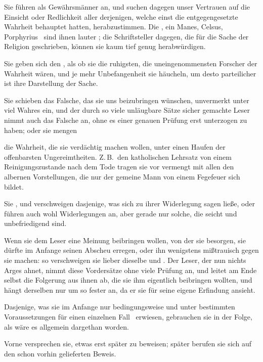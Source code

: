 \begin{aufza}
\begin{aufzb}
\begin{aufzc}
\item Sie führen  als Gewährsmänner an, und suchen dagegen unser Vertrauen auf die Einsicht oder Redlichkeit aller derjenigen, welche einst die entgegengesetzte Wahrheit behauptet hatten, herabzustimmen. Die , ein Manes, Celsus, Porphyrius \uA\ sind ihnen lauter ; die Schriftsteller dagegen, die für die Sache der Religion geschrieben, können sie kaum tief genug herabwürdigen.
\item Sie geben sich den , als ob sie die ruhigsten, die uneingenommensten Forscher der Wahrheit wären, und je mehr Unbefangenheit sie häucheln, um desto parteilicher ist ihre Darstellung der Sache.
\item Sie schieben das Falsche, das sie uns beizubringen wünschen, unvermerkt unter viel Wahres ein, und der durch so viele unläugbare Sätze sicher gemachte Leser nimmt auch das Falsche an, ohne es einer genauen Prüfung erst unterzogen zu haben; oder sie mengen
\item die Wahrheit, die sie verdächtig machen wollen, unter einen Haufen der offenbarsten Ungereimtheiten. Z.\,B.\ den katholischen Lehrsatz von einem Reinigungszustande nach dem Tode tragen sie vor vermengt mit allen den albernen Vorstellungen, die nur der gemeine Mann von einem Fegefeuer sich bildet.
\item Sie , und verschweigen dasjenige, was sich zu ihrer Widerlegung sagen ließe, oder führen auch wohl Widerlegungen an, aber gerade nur solche, die seicht und unbefriedigend sind.
\item Wenn sie dem Leser eine Meinung beibringen wollen, von der sie besorgen, sie dürfte im Anfange seinen Abscheu erregen, oder ihn wenigstens mißtrauisch gegen sie machen: so verschweigen sie lieber dieselbe und . Der Leser, der nun nichts Arges ahnet, nimmt diese Vordersätze ohne viele Prüfung an, und leitet am Ende selbst die Folgerung aus ihnen ab, die sie ihm eigentlich beibringen wollten, und hängt derselben nur um so fester an, da er sie für seine eigene Erfindung ansieht.
\item Dasjenige, was sie im Anfange nur bedingungsweise und unter bestimmten Voraussetzungen für einen einzelnen Fall \udgl\ erwiesen, gebrauchen sie in der Folge, als wäre es allgemein dargethan worden.
\item Vorne versprechen sie, etwas erst später zu beweisen; später berufen sie sich auf den schon vorhin gelieferten Beweis.

\end{aufzc}
\end{aufzb}
\end{aufza}
